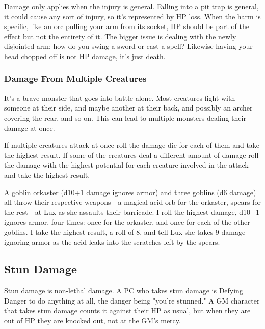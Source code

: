  

Damage only applies when the injury is general. Falling into a pit trap is general, it could cause any sort of injury, so it's represented by HP loss. When the harm is specific, like an orc pulling your arm from its socket, HP should be part of the effect but not the entirety of it. The bigger issue is dealing with the newly disjointed arm: how do you swing a sword or cast a spell? Likewise having your head chopped off is not HP damage, it's just death.

 
\subsubsection{Damage From Multiple Creatures}     
 

It's a brave monster that goes into battle alone. Most creatures fight with someone at their side, and maybe another at their back, and possibly an archer covering the rear, and so on. This can lead to multiple monsters dealing their damage at once.

 

If multiple creatures attack at once roll the damage die for each of them and take the highest result. If some of the creatures deal a different amount of damage roll the damage with the highest potential for each creature involved in the attack and take the highest result.

 
\startExample
A goblin orkaster (d10+1 damage ignores armor) and three goblins (d6 damage) all throw their respective weapons—a magical acid orb for the orkaster, spears for the rest—at Lux as she assaults their barricade. I roll the highest damage, d10+1 ignores armor, four times: once for the orkaster, and once for each of the other goblins. I take the highest result, a roll of 8, and tell Lux she takes 9 damage ignoring armor as the acid leaks into the scratches left by the spears.
\stopExample
 
\subsection{Stun Damage}    
 

Stun damage is non-lethal damage. A PC who takes stun damage is Defying Danger to do anything at all, the danger being "you're stunned." A GM character that takes stun damage counts it against their HP as usual, but when they are out of HP they are knocked out, not at the GM's mercy.

